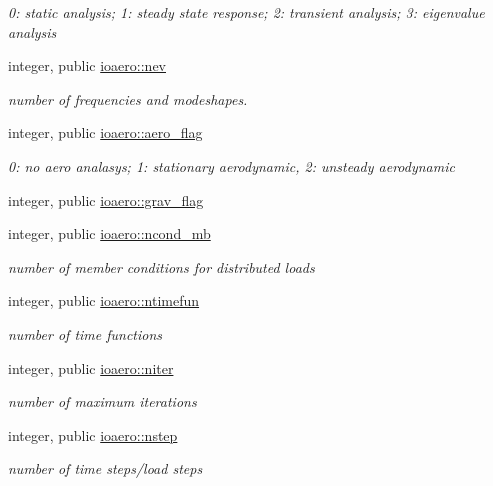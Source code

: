 \begin{DoxyCompactItemize}
\begin{DoxyCompactList}\small\item\em 0\+: static analysis; 1\+: steady state response; 2\+: transient analysis; 3\+: eigenvalue analysis \end{DoxyCompactList}\item 
integer, public \hyperlink{namespaceioaero_a1216c8699aea9eb27e3d795cc9d8d271}{ioaero\+::nev}
\begin{DoxyCompactList}\small\item\em number of frequencies and modeshapes. \end{DoxyCompactList}\item 
integer, public \hyperlink{namespaceioaero_afb280b6ca8de323c9a07076df81a71e1}{ioaero\+::aero\+\_\+flag}
\begin{DoxyCompactList}\small\item\em 0\+: no aero analasys; 1\+: stationary aerodynamic, 2\+: unsteady aerodynamic \end{DoxyCompactList}\item 
integer, public \hyperlink{namespaceioaero_a831fe87d45ef05e3e29a8c4c2fc88c8f}{ioaero\+::grav\+\_\+flag}
\item 
integer, public \hyperlink{namespaceioaero_ab9193f4ff70a22ae5858118fc653f22b}{ioaero\+::ncond\+\_\+mb}
\begin{DoxyCompactList}\small\item\em number of member conditions for distributed loads \end{DoxyCompactList}\item 
integer, public \hyperlink{namespaceioaero_a8d0cfe1f4a5677d76ba3f3e775b12d1e}{ioaero\+::ntimefun}
\begin{DoxyCompactList}\small\item\em number of time functions \end{DoxyCompactList}\item 
integer, public \hyperlink{namespaceioaero_ac008486fd12e0029a1ef77b3ca5e12c3}{ioaero\+::niter}
\begin{DoxyCompactList}\small\item\em number of maximum iterations \end{DoxyCompactList}\item 
integer, public \hyperlink{namespaceioaero_ab078a397454a22b07a19ae3a7443a561}{ioaero\+::nstep}
\begin{DoxyCompactList}\small\item\em number of time steps/load steps \end{DoxyCompactList}\item 

\end{DoxyCompactItemize}

